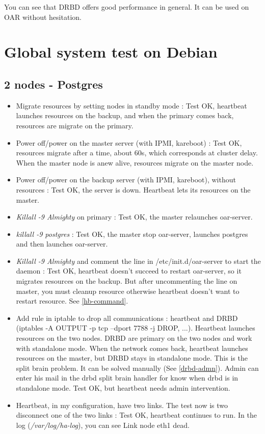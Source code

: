 \documentclass[a4paper,10pt]{report}
\begin{document}
You can see that DRBD offers good performance in general. It can be used on OAR without hesitation.



\section{Global system test on Debian}
\subsection{2 nodes - Postgres}
\begin{itemize}
 \item Migrate resources by setting nodes in standby mode : Test OK, heartbeat launches resources on the backup, and when the primary comes back, resources are migrate on the primary.
 \item Power off/power on the master server (with IPMI, kareboot) : Test OK, resources migrate after a time, about 60s, which corresponds at cluster delay. When the master node is anew alive, resources migrate on the master node.
 \item Power off/power on the backup server (with IPMI, kareboot), without resources : Test OK, the server is down. Heartbeat lets its resources on the master.
 \item \textit{Killall -9 Almighty} on primary : Test OK, the master relaunches oar-server.
 \item \textit{killall -9 postgres} : Test OK, the master stop oar-server, launches postgres and then launches oar-server.
 \item \textit{Killall -9 Almighty} and comment the line in /etc/init.d/oar-server to start the daemon : Test OK, heartbeat doesn't succeed to restart oar-server, so it migrates resources on the backup.
But after uncommenting the line on master, you must cleanup resource otherwise heartbeat doesn't want to restart resource. See \ref{hb-command}.
 \item Add rule in iptable to drop all communications : heartbeat and DRBD (iptables -A OUTPUT -p tcp --dport 7788 -j DROP, ...). Heartbeat launches resources on the two nodes. DRBD are primary on the two nodes and work with standalone mode. When the network comes back, heartbeat launches resources on the master, but DRBD stays in standalone mode. This is the split brain problem. It can be solved manually (See \ref{drbd-admn}).
Admin can enter his mail in the drbd split brain handler for know when drbd is in standalone mode. Test OK, but heartbeat needs admin intervention.
 \item Heartbeat, in my configuration, have two links. The test now is two disconnect one of the two links : Test OK, heartbeat continues to run. In the log (\textit{/var/log/ha-log}), you can see Link node eth1 dead.
\end{itemize}
\end{document}
